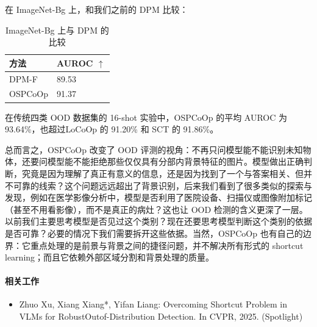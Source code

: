 在 ImageNet-Bg 上，和我们之前的 DPM 比较：

\begin{table}[H]\centering
\caption*{ImageNet-Bg 上与 DPM 的比较}
\begin{tabular}{ll}\toprule
\textbf{方法} & \textbf{AUROC $\uparrow$} \\ \midrule
DPM-F & 89.53 \\
OSPCoOp & 91.37 \\
\bottomrule\end{tabular}
\end{table}

在传统四类 OOD 数据集的 16-shot 实验中，OSPCoOp 的平均 AUROC 为 93.64\%，也超过LoCoOp 的 91.20\% 和 SCT 的 91.86\%。

总而言之，OSPCoOp 改变了 OOD 评测的视角：不再只问模型能不能识别未知物体，还要问模型能不能拒绝那些仅仅具有分部内背景特征的图片。模型做出正确判断，究竟是因为理解了真正有意义的信息，还是因为找到了一个与答案相关、但并不可靠的线索？这个问题远远超出了背景识别，后来我们看到了很多类似的探索与发现，例如在医学影像分析中，模型是否利用了医院设备、扫描仪或图像附加标记（甚至不用看影像），而不是真正的病灶？这也让 OOD 检测的含义更深了一层。以前我们主要思考模型是否见过这个类别？现在还要思考模型判断这个类别的依据是否可靠？必要的情况下我们需要拆开这些依据。当然，OSPCoOp 也有自己的边界：它重点处理的是前景与背景之间的捷径问题，并不解决所有形式的 shortcut learning；而且它依赖外部区域分割和背景处理的质量。

\paragraph{相关工作}

\begin{itemize}
  \item Zhuo Xu, Xiang Xiang*, Yifan Liang: Overcoming Shortcut Problem in VLMs for RobustOutof-Distribution Detection. In CVPR, 2025. (Spotlight)
\end{itemize}
